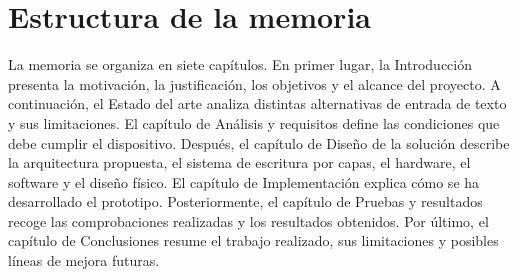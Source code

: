\documentclass[
    school=etsisi,
    type=pfg,
    degree=61CI,
]{upm-report}
\begin{document}
\section{Estructura de la memoria}
\label{sec:estructura-memoria}

La memoria se organiza en siete capítulos. En primer lugar, la Introducción
presenta la motivación, la justificación, los objetivos y el alcance del proyecto.
A continuación, el Estado del arte analiza distintas alternativas de entrada de
texto y sus limitaciones. El capítulo de Análisis y requisitos define las
condiciones que debe cumplir el dispositivo. Después, el capítulo de Diseño de la
solución describe la arquitectura propuesta, el sistema de escritura por capas,
el hardware, el software y el diseño físico. El capítulo de Implementación explica
cómo se ha desarrollado el prototipo. Posteriormente, el capítulo de Pruebas y
resultados recoge las comprobaciones realizadas y los resultados obtenidos. Por
último, el capítulo de Conclusiones resume el trabajo realizado, sus limitaciones
y posibles líneas de mejora futuras.











\end{document}
